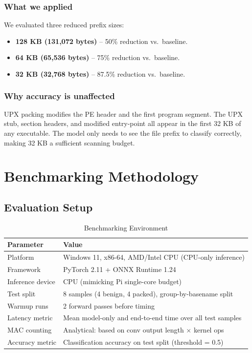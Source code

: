\documentclass[12pt,a4paper]{article}
\begin{document}
\subsubsection{What we applied}
We evaluated three reduced prefix sizes:
\begin{itemize}
  \item \textbf{128 KB (131,072 bytes)} -- 50\% reduction vs.\ baseline.
  \item \textbf{64 KB (65,536 bytes)} -- 75\% reduction vs.\ baseline.
  \item \textbf{32 KB (32,768 bytes)} -- 87.5\% reduction vs.\ baseline.
\end{itemize}

\subsubsection{Why accuracy is unaffected}
UPX packing modifies the PE header and the first program segment.  The UPX
stub, section headers, and modified entry-point all appear in the first 32 KB
of any executable.  The model only needs to see the file prefix to classify
correctly, making 32 KB a sufficient scanning budget.

\section{Benchmarking Methodology}

\subsection{Evaluation Setup}

\begin{table}[h!]
\centering
\caption{Benchmarking Environment}
\renewcommand{\arraystretch}{1.3}
\begin{tabular}{L{4cm} L{9cm}}
\toprule
{}
\color{white}\textbf{Parameter} & \color{white}\textbf{Value} \\
\midrule
Platform & Windows 11, x86-64, AMD/Intel CPU (CPU-only inference) \\
Framework & PyTorch 2.11 + ONNX Runtime 1.24 \\
Inference device & CPU (mimicking Pi single-core budget) \\
Test split & 8 samples (4 benign, 4 packed), group-by-basename split \\
Warmup runs & 2 forward passes before timing \\
Latency metric & Mean model-only and end-to-end time over all test samples \\
MAC counting & Analytical: based on conv output length $\times$ kernel ops \\
Accuracy metric & Classification accuracy on test split (threshold = 0.5) \\
\bottomrule
\end{tabular}
\end{table}
\end{document}
